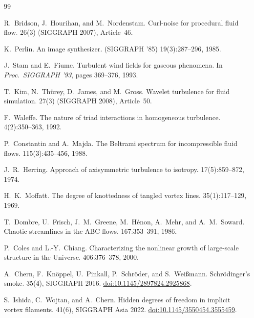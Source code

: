 \documentclass[11pt]{article}
\theoremstyle{remark}
\begin{document}
\begin{thebibliography}{99}
\itemsep2pt

R.~Bridson, J.~Hourihan, and M.~Nordenstam.
\newblock Curl-noise for procedural fluid flow.
 26(3) (SIGGRAPH 2007), Article~46.

K.~Perlin.
\newblock An image synthesizer.
 (SIGGRAPH '85) 19(3):287--296, 1985.

J.~Stam and E.~Fiume.
\newblock Turbulent wind fields for gaseous phenomena.
\newblock In {\em Proc.\ SIGGRAPH '93}, pages 369--376, 1993.

T.~Kim, N.~Th\"urey, D.~James, and M.~Gross.
\newblock Wavelet turbulence for fluid simulation.
 27(3) (SIGGRAPH 2008), Article~50.

F.~Waleffe.
\newblock The nature of triad interactions in homogeneous turbulence.
 4(2):350--363, 1992.

P.~Constantin and A.~Majda.
\newblock The Beltrami spectrum for incompressible fluid flows.
 115(3):435--456, 1988.

J.~R.~Herring.
\newblock Approach of axisymmetric turbulence to isotropy.
 17(5):859--872, 1974.

H.~K.~Moffatt.
\newblock The degree of knottedness of tangled vortex lines.
 35(1):117--129, 1969.

T.~Dombre, U.~Frisch, J.~M.~Greene, M.~H\'enon, A.~Mehr, and A.~M.~Soward.
\newblock Chaotic streamlines in the ABC flows.
 167:353--391, 1986.

P.~Coles and L.-Y.~Chiang.
\newblock Characterizing the nonlinear growth of large-scale structure in the Universe.
 406:376--378, 2000.

A.~Chern, F.~Kn\"oppel, U.~Pinkall, P.~Schr\"oder, and S.~Wei{\ss}mann.
\newblock Schr\"odinger's smoke.
 35(4), SIGGRAPH 2016.
\newblock \href{https://doi.org/10.1145/2897824.2925868}{doi:10.1145/2897824.2925868}.

S.~Ishida, C.~Wojtan, and A.~Chern.
\newblock Hidden degrees of freedom in implicit vortex filaments.
 41(6), SIGGRAPH Asia 2022.
\newblock \href{https://doi.org/10.1145/3550454.3555459}{doi:10.1145/3550454.3555459}.


\end{thebibliography}
\end{document}
